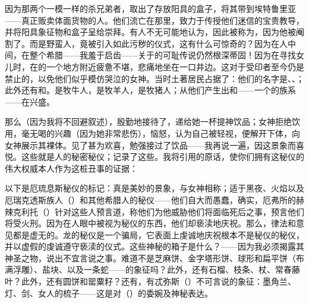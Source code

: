 因为那两个一模一样的杀兄弟者，取出了存放阳具的盒子，将其带到埃特鲁里亚——真正贩卖体面货物的人。他们流亡在那里，致力于传授他们迷信的宝贵教导，并将阳具象征物和盒子呈给崇拜。有人不无可能地认为，因此被称为，因为他被阉割了。而是野蛮人，竟被引入如此污秽的仪式，这有什么可惊奇的？因为在人中间，在整个希腊——我羞于启齿——关于的可耻传说仍然根深蒂固！因为在寻找女儿时，在的一个地方附近疲惫不堪，悲痛地坐在一口井边。这对于受印者至今仍是禁止的，以免他们似乎模仿哭泣的女神。当时土著居民占据了：他们的名字是、、；此外还有和。是牧牛人，是牧羊人，是牧猪人；从他们产生出和——一个的族系——在兴盛。\par

那么（因为我将不回避叙述），殷勤地接待了，递给她一杯提神饮品；女神拒绝饮用，毫无喝的兴趣（因为她非常悲伤），恼怒，认为自己被轻视，便解开下体，向女神展示其裸体。见了甚为欢喜，勉强接过了饮品——我再说一遍，因这景象而喜悦。这些就是人的秘密秘仪；记录了这些。我将引用的原话，使你们拥有这秘仪的伟大权威本人作为这桩丑事的证据：\par

\par

以下是厄琉息斯秘仪的标记：真是美妙的景象，与女神相称；适于黑夜、火焰以及厄瑞克透斯族人（）和其他希腊人的秘仪——他们自大而愚蠢，确实，厄弗所的赫辣克利托（）针对这些人预言道，称他们为他威胁他们将面临死后之事，预言他们将受火刑。因为在人眼中被视为秘仪的东西，他们却亵渎地庆祝。那么，律法和意见都是虚无的。龙的秘仪是一个骗局，它表面上虔诚地庆祝根本不是秘仪的秘仪，并以虚假的虔诚遵守亵渎的仪式。这些神秘的箱子是什么？——因为我必须揭露其神圣之物，说出不宜言说之事。难道不是芝麻饼、金字塔形饼、球形和扁平饼（布满浮雕）、盐块、以及一条蛇——的象征吗？此外，还有石榴、枝条、杖、常春藤叶？此外，还有圆饼和罂粟籽？还有，有忒弥斯（）不可言说的象征：墨角兰、灯、剑、女人的梳子——这是对（）的委婉及神秘表达。\par

